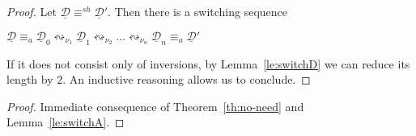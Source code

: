 \documentclass[a4paper,UKenglish,cleveref,pdftex,thm-restate,numberwithinsect]{lipics-v2021}
\newcommand{\dder}[1]{\mathscr{#1}}
\newcommand{\der}[1]{\underline{\dder{#1}}}
\newcommand{\shift}[1]{\ensuremath{\mathrel{{\leftrightsquigarrow}_{#1}}}}
\newcommand{\shifteq}[1][]{\ensuremath{\mathrel{{\equiv}^\mathit{sh}_{#1}}}}
\begin{document}
\thNoNeed*
\label{thNoNeed-proof}


\begin{proof}
  Let $\der{D} \shifteq \der{D}'$. Then there is a switching
  sequence
  \begin{center}
    $\der{D} \equiv_a \der{D}_0 \shift{\nu_1} \der{D}_1 \shift{\nu_2} \ldots
    \shift{\nu_n} \der{D}_n \equiv_a \der{D}'$
  \end{center}
  If it does not consist only of inversions, by Lemma~\ref{le:switchD}
  we can reduce its length by $2$. An inductive reasoning allows us to
  conclude.
\end{proof}


\coCanonical*
\label{coCanonical-proof}

\begin{proof}
  Immediate consequence of Theorem~\ref{th:no-need} and Lemma~\ref{le:switchA}.
\end{proof}
\end{document}
